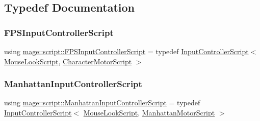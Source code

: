 \subsection{Typedef Documentation}
\hypertarget{namespacemage_1_1script_a851bfe5cd371dbeec9d1b629ed52ab61}{}\label{namespacemage_1_1script_a851bfe5cd371dbeec9d1b629ed52ab61} 
\subsubsection{\texorpdfstring{F\+P\+S\+Input\+Controller\+Script}{FPSInputControllerScript}}
{\footnotesize\ttfamily using \hyperlink{namespacemage_1_1script_a851bfe5cd371dbeec9d1b629ed52ab61}{mage\+::script\+::\+F\+P\+S\+Input\+Controller\+Script} = typedef \hyperlink{classmage_1_1script_1_1_input_controller_script}{Input\+Controller\+Script}$<$ \hyperlink{classmage_1_1script_1_1_mouse_look_script}{Mouse\+Look\+Script}, \hyperlink{classmage_1_1script_1_1_character_motor_script}{Character\+Motor\+Script} $>$}

\hypertarget{namespacemage_1_1script_ae399ac9a69c775626d6080400f8716e9}{}\label{namespacemage_1_1script_ae399ac9a69c775626d6080400f8716e9} 
\subsubsection{\texorpdfstring{Manhattan\+Input\+Controller\+Script}{ManhattanInputControllerScript}}
{\footnotesize\ttfamily using \hyperlink{namespacemage_1_1script_ae399ac9a69c775626d6080400f8716e9}{mage\+::script\+::\+Manhattan\+Input\+Controller\+Script} = typedef \hyperlink{classmage_1_1script_1_1_input_controller_script}{Input\+Controller\+Script}$<$ \hyperlink{classmage_1_1script_1_1_mouse_look_script}{Mouse\+Look\+Script}, \hyperlink{classmage_1_1script_1_1_manhattan_motor_script}{Manhattan\+Motor\+Script} $>$}

